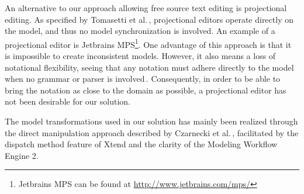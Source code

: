 An alternative to our approach allowing free source text editing is projectional editing. As specified by Tomasetti et al.\,\cite{tomasetti11}, projectional editors operate directly on the model, and thus no model synchronization is involved. An example of a projectional editor is Jetbrains MPS\footnote{Jetbrains MPS can be found at \url{http://www.jetbrains.com/mps/}}. One advantage of this approach is that it is impossible to create inconsistent models. However, it also means a loss of notational flexibility, seeing that any notation must adhere directly to the model when no grammar or parser is involved\,\cite{conf/models/Voelter10}. Consequently, in order to be able to bring the notation as close to the domain as possible, a projectional editor has not been desirable for our solution.

The model transformations used in our solution has mainly been realized through the direct manipulation approach described by Czarnecki et al.\,\cite{czarnecki06}, facilitated by the dispatch method feature of Xtend and the clarity of the Modeling Workflow Engine 2.








